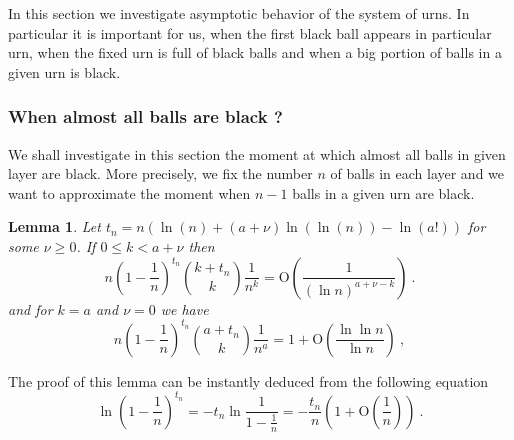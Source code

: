 \documentclass[submission]{dmtcs}
\newtheorem{lemma}{Lemma}
\newcommand{\E}[1]{\mathbf{E}\left[#1\right]}
\newcommand{\BigO}[1]{\mathrm{O}\left(#1\right)}
\begin{document}
In this section we investigate asymptotic behavior of the system of urns. 
In particular it is important for us, when the first black ball appears in particular 
urn, when the fixed urn is full of black balls and when a big portion of balls in a given
urn is black.  


\subsubsection{When almost all balls are black ?}

We shall investigate in this section the moment at which almost all
balls in given layer are black. More precisely, we fix the number $n$ of balls 
in each layer and we want to approximate the moment when $n-1$ balls in 
a given urn are black.

\begin{lemma}
\label{xxx2}
Let $t_n = n(\ln(n) + (a + \nu )\ln(\ln(n)) - \ln(a!))$ for some $\nu \geq 0$.
If $0\leq k < a + \nu$ then
$$
 n\left(1-\frac1n\right)^{t_n} \binom{k+t_n}{k}\frac{1}{n^k} = 
 \BigO{\frac{1}{(\ln n)^{a + \nu -k}}}~.
$$
and for $k=a$ and $\nu=0$ we have
$$
 n\left(1-\frac1n\right)^{t_n} \binom{a+t_n}{k}\frac{1}{n^a} = 
 1 + \BigO{\frac{\ln\ln n}{\ln n}}~,
$$
\end{lemma}

The proof of this lemma can be instantly deduced from the following
equation
\begin{equation}
\label{lll:1}
\ln \left(1-\frac1n\right)^{t_n} = 
  - t_n \ln\frac{1}{1-\frac1n} = 
 - \frac{t_n}{n}\left(1+\BigO{\frac1n}\right)~.
\end{equation}
%
\end{document}
